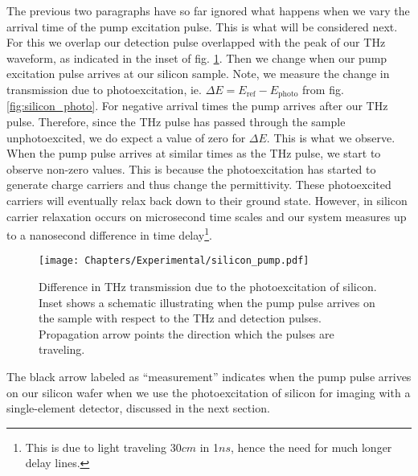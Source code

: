The previous two paragraphs have so far ignored what happens when we vary the arrival time of the pump excitation pulse. This is what will be considered next. For this we overlap our detection pulse overlapped with the peak of our THz waveform, as indicated in the inset of fig. \ref{fig:silicon_pump}. Then we change when our pump excitation pulse arrives at our silicon sample. Note, we measure the change in transmission due to photoexcitation, ie. $\Delta E = E_{\mbox{ref}} - E_{\mbox{photo}}$ from fig. \ref{fig:silicon_photo}. For negative arrival times the pump arrives after our THz pulse. Therefore, since the THz pulse has passed through the sample unphotoexcited, we do expect a value of zero for $\Delta E$. This is what we observe. When the pump pulse arrives at similar times as the THz pulse, we start to observe non-zero values. This is because the photoexcitation has started to generate charge carriers and thus change the permittivity. These photoexcited carriers will eventually relax back down to their ground state. However, in silicon carrier relaxation occurs on microsecond time scales \cite{si_lifetime} and our system measures up to a nanosecond difference in time delay\footnote{This is due to light traveling 30$cm$ in 1$ns$, hence the need for much longer delay lines.}. 
\begin{figure}[h!]\centering
\texttt{[image: Chapters/Experimental/silicon\_pump.pdf]} %
\caption{Difference in THz transmission due to the photoexcitation of silicon. Inset shows a schematic illustrating when the pump pulse arrives on the sample with respect to the THz and detection pulses. Propagation arrow points the direction which the pulses are traveling.}
\label{fig:silicon_pump}
\end{figure}

The black arrow labeled as ``measurement'' indicates when the pump pulse arrives on our silicon wafer when we use the photoexcitation of silicon for imaging with a single-element detector, discussed in the next section.






